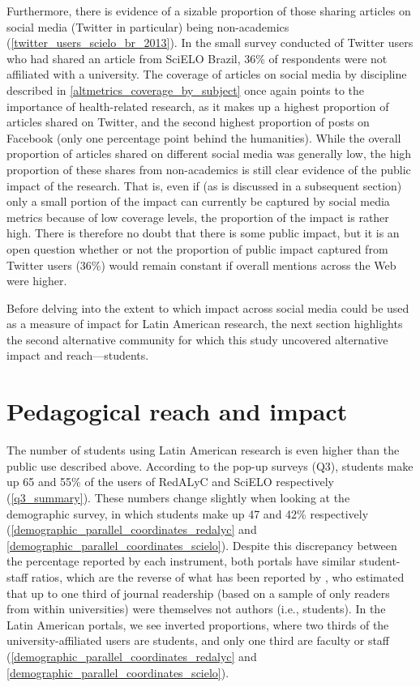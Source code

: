 Furthermore, there is evidence of a sizable proportion of those sharing articles on social media (Twitter in particular) being non-academics (\autoref{twitter_users_scielo_br_2013}). In the small survey conducted of Twitter users who had shared an article from SciELO Brazil, 36\% of respondents were not affiliated with a university. The coverage of articles on social media by discipline described in \autoref{altmetrics_coverage_by_subject} once again points to the importance of health-related research, as it makes up a highest proportion of articles shared on Twitter, and the second highest proportion of posts on Facebook (only one percentage point behind the humanities). While the overall proportion of articles shared on different social media was generally low, the high proportion of these shares from non-academics is still clear evidence of the public impact of the research. That is, even if (as is discussed in a subsequent section) only a small portion of the impact can currently be captured by social media metrics because of low coverage levels, the proportion of the impact is rather high. There is therefore no doubt that there is some public impact, but it is an open question whether or not the proportion of public impact captured from Twitter users (36\%) would remain constant if overall mentions across the Web were higher.

Before delving into the extent to which impact across social media could be used as a measure of impact for Latin American research, the next section highlights the second alternative community for which this study uncovered alternative impact and reach—students.

\section{Pedagogical reach and impact}
\label{pedagogicalreachandimpact}

The number of students using Latin American research is even higher than the public use described above. According to the pop-up surveys (Q3), students make up 65 and 55\% of the users of RedALyC and SciELO respectively (\autoref{q3_summary}). These numbers change slightly when looking at the demographic survey, in which students make up 47 and 42\% respectively (\autoref{demographic_parallel_coordinates_redalyc} and \autoref{demographic_parallel_coordinates_scielo}). Despite this discrepancy between the percentage reported by each instrument, both portals have similar student-staff ratios, which are the reverse of what has been reported by  \citet{Tenopir2000}, who estimated that up to one third of journal readership (based on a sample of only readers from within universities) were themselves not authors (i.e., students). In the Latin American portals, we see inverted proportions, where two thirds of the university-affiliated users are students, and only one third are faculty or staff (\autoref{demographic_parallel_coordinates_redalyc} and \autoref{demographic_parallel_coordinates_scielo}).

